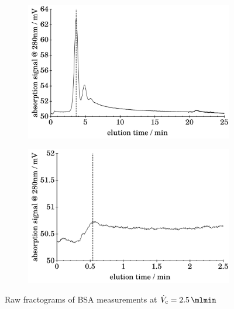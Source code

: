 \begin{figure}[H]
\begin{center}
  \\\vspace*{.5em}
  \begin{subfigure}{\subFigSize}
    \includegraphics[width=\linewidth]{./images/data/img_BSA_VC_2_5_r3_te.pdf}
    \label{subfig:raw_BSA2_5_r3_te}
  \end{subfigure}
  \begin{subfigure}{\subFigSize}
    \includegraphics[width=\linewidth]{./images/data/img_BSA_VC_2_5_r3_t0.pdf}
  \end{subfigure}
  \end{center}
  \vspace*{-3ex}    
  \caption[Raw fractograms of BSA measurements at $\Vc = \SI{2.5}{\mlmin}$]{Raw fractograms of BSA measurements at $\Vc 
  = \SI{2.5}{\mlmin}$}
  \label{fig:raw_BSA_2_5_UV} 
\end{figure}
